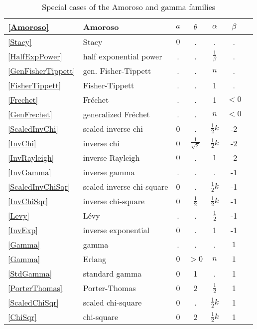 \begin{table*}[p]
\begin{center}
\label{AmorosoTable}
\caption[Amoroso and gamma distributions -- Special cases]{Special cases of the Amoroso and gamma families}
~\\
{\renewcommand{\arraystretch}{1.1} 
\begin{tabular}{llccccl}
\eqref{Amoroso} &Amoroso & $a$ & $\theta$ & $\alpha$ & $\beta$
\\ \hline
\eqref{Stacy} & Stacy & $0$ & . & . & . \\
\eqref{HalfExpPower} & half exponential power & . & . & $\tfrac{1}{\beta}$ & . \\
\eqref{GenFisherTippett} & gen. Fisher-Tippett  & . & . & $n$ & .  \\
\eqref{FisherTippett} &  Fisher-Tippett & . & . & 1 & .  \\
\eqref{Frechet} &Fr\'{e}chet  & . & . & 1 &  $<\!\!0$  \\
\eqref{GenFrechet} &  generalized Fr\'{e}chet & . & . & $n$ & $<\!\!0$ \\
\eqref{ScaledInvChi} &scaled inverse chi& 0 & . & $\tfrac{1}{2}k$  & -2  \\
\eqref{InvChi} & inverse chi  & 0 & $\frac{1}{\sqrt{2}}$ & $\tfrac{1}{2}k$ & -2 \\
\eqref{InvRayleigh} &  inverse Rayleigh  & $0$ & . & $1$ & -2 \\
\eqref{InvGamma} & inverse gamma & . & . & . & -1 \\
\eqref{ScaledInvChiSqr} & scaled inverse chi-square & 0 & . & $\tfrac{1}{2}k$ & -1 \\
\eqref{InvChiSqr} & inverse chi-square & 0 & $\frac{1}{2}$ & $\tfrac{1}{2}k$ & -1 \\
\eqref{Levy} & L\'{e}vy &  . & . & $\frac{1}{2}$ & -1 \\
\eqref{InvExp} &  inverse exponential & 0  & . & 1 & -1 \\
\eqref{Gamma} &gamma & . & . & . & $1$ \\
\eqref{Gamma} & Erlang & $0$ & $>\!\!0$ & $n$ & $1$ \\
\eqref{StdGamma} &standard gamma & 0 & 1 & . & 1  \\ 
\eqref{PorterThomas} & Porter-Thomas & 0 & 2 & $\tfrac{1}{2}$ & 1 \\
\eqref{ScaledChiSqr} & scaled chi-square & 0 & . & $\tfrac{1}{2}k$ & 1 \\
\eqref{ChiSqr} & chi-square & 0 & 2 & $\tfrac{1}{2}k$ & 1 \\

\end{tabular}}
\end{center}
\end{table*}
